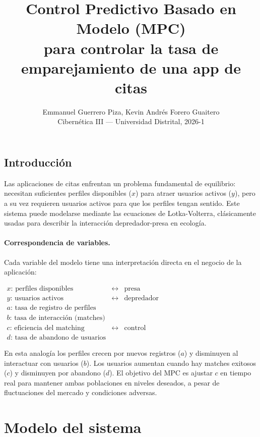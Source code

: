 \documentclass[twocolumn,10pt]{article}
\title{\textbf{Control Predictivo Basado en Modelo (MPC)} \\
       \large{para controlar la tasa de emparejamiento de una app de citas}}
\author{Emmanuel Guerrero Piza, Kevin Andr\'es Forero Guaitero \\
        \small Cibern\'etica III --- Universidad Distrital, 2026-1}
\date{}
\begin{document}
\small
\twocolumn[
  \maketitle
  \thispagestyle{empty}
]

\subsection*{Introducci\'on}

Las aplicaciones de citas enfrentan un problema fundamental de
equilibrio: necesitan suficientes perfiles disponibles ($x$) para
atraer usuarios activos ($y$), pero a su vez requieren usuarios
activos para que los perfiles tengan sentido. Este sistema puede
modelarse mediante las ecuaciones de Lotka-Volterra, cl\'asicamente
usadas para describir la interacci\'on depredador-presa en ecolog\'ia.

\paragraph{Correspondencia de variables.}
Cada variable del modelo tiene una interpretaci\'on directa en el
negocio de la aplicaci\'on:

\begin{center}
\footnotesize
$\begin{array}{lll}
x\text{: perfiles disponibles} &\longleftrightarrow& \text{presa} \\
y\text{: usuarios activos}     &\longleftrightarrow& \text{depredador} \\
a\text{: tasa de registro de perfiles} &&\\
b\text{: tasa de interacci\'on (matches)} &&\\
c\text{: eficiencia del matching} &\longleftrightarrow& \text{control} \\
d\text{: tasa de abandono de usuarios} &&
\end{array}$
\end{center}

En esta analog\'ia los perfiles crecen por nuevos registros ($a$)
y disminuyen al interactuar con usuarios ($b$). Los usuarios
aumentan cuando hay matches exitosos ($c$) y disminuyen por
abandono ($d$). El objetivo del MPC es ajustar $c$ en tiempo
real para mantener ambas poblaciones en niveles deseados, a
pesar de fluctuaciones del mercado y condiciones adversas.

\section{Modelo del sistema}
\end{document}
